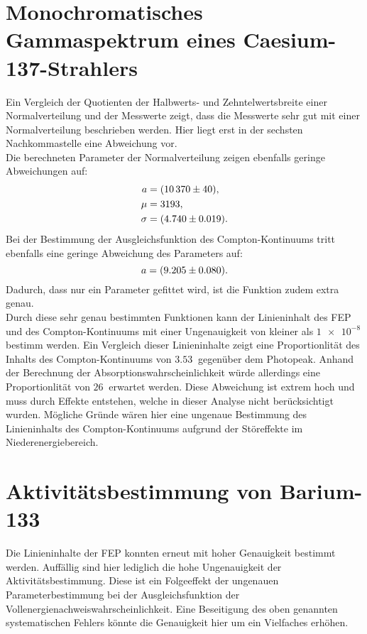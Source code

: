 \section{Monochromatisches Gammaspektrum eines Caesium-137-Strahlers}

Ein Vergleich der Quotienten der Halbwerts- und Zehntelwertsbreite einer Normalverteilung und der Messwerte zeigt, dass die Messwerte sehr gut mit einer
Normalverteilung beschrieben werden. Hier liegt erst in der sechsten Nachkommastelle eine Abweichung vor.\\
Die berechneten Parameter der Normalverteilung zeigen ebenfalls geringe Abweichungen auf:
\begin{align}
    a &= \qty{10370 \pm 40}{},\\
    \mu &= \qty{3193 \pm 0}{},\\
    \sigma &= \qty{4.740 \pm 0.019}{}.
\end{align}
Bei der Bestimmung der Ausgleichsfunktion des Compton-Kontinuums tritt ebenfalls eine geringe Abweichung des Parameters auf:
\begin{equation}
    a = \qty{9.205 \pm 0.080}{}.
\end{equation}
Dadurch, dass nur ein Parameter gefittet wird, ist die Funktion zudem extra genau.\\
Durch diese sehr genau bestimmten Funktionen kann der Linieninhalt des FEP und des Compton-Kontinuums mit einer Ungenauigkeit von kleiner als $\qty{1e-8}{}$
bestimm werden. Ein Vergleich dieser Linieninhalte zeigt eine Proportionlität des Inhalts des Compton-Kontinuums von $\qty{3.53}{}$ gegenüber dem Photopeak. Anhand der Berechnung der Absorptionswahrscheinlichkeit
würde allerdings eine Proportionlität von $\qty{26}{}$ erwartet werden. Diese Abweichung ist extrem hoch und muss durch Effekte entstehen, welche in dieser Analyse nicht berücksichtigt wurden.
Mögliche Gründe wären hier eine ungenaue Bestimmung des Linieninhalts des Compton-Kontinuums aufgrund der Störeffekte im Niederenergiebereich.

\section{Aktivitätsbestimmung von Barium-133}

Die Linieninhalte der FEP konnten erneut mit hoher Genauigkeit bestimmt werden. Auffällig sind hier lediglich die hohe Ungenauigkeit der Aktivitätsbestimmung. Diese ist 
ein Folgeeffekt der ungenauen Parameterbestimmung bei der Ausgleichsfunktion der Vollenergienachweiswahrscheinlichkeit. Eine Beseitigung des oben genannten systematischen 
Fehlers könnte die Genauigkeit hier um ein Vielfaches erhöhen.

